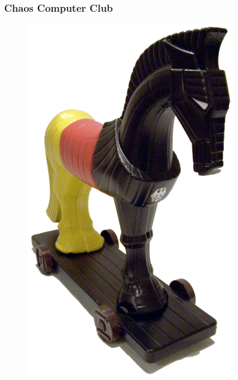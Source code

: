 \begin{frame}
  \frametitle{Chaos Computer Club}
  \begin{figure}
    \includegraphics[height=0.7\textheight]{../../img/trojaner.png}
  \end{figure}
\end{frame}
